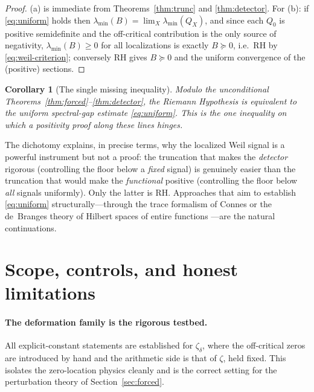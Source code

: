 \documentclass[11pt]{amsart}
\newtheorem{corollary}[theorem]{Corollary}
\theoremstyle{definition}
\theoremstyle{remark}
\newcommand{\lmin}{\lambda_{\min}}
\newcommand{\Qzero}{Q_{0}}
\begin{document}
\begin{proof}
(a) is immediate from Theorems~\ref{thm:trunc} and \ref{thm:detector}. For
(b): if \eqref{eq:uniform} holds then $\lmin(B)=\lim_X\lmin(Q_X)$, and since
each $\Qzero$ is positive semidefinite and the off-critical contribution is
the only source of negativity, $\lmin(B)\ge0$ for all localizations is
exactly $B\succeq0$, i.e.\ RH by \eqref{eq:weil-criterion}; conversely RH
gives $B\succeq0$ and the uniform convergence of the (positive) sections.
\end{proof}

\begin{corollary}[The single missing inequality]\label{cor:LB}
Modulo the unconditional Theorems~\ref{thm:forced}--\ref{thm:detector}, the
Riemann Hypothesis is equivalent to the uniform spectral-gap estimate
\eqref{eq:uniform}. This is the one inequality on which a positivity proof
along these lines hinges.
\end{corollary}

The dichotomy explains, in precise terms, why the localized Weil signal is a
powerful instrument but not a proof: the truncation that makes the
\emph{detector} rigorous (controlling the floor below a \emph{fixed} signal)
is genuinely easier than the truncation that would make the \emph{functional}
positive (controlling the floor below \emph{all} signals uniformly). Only the
latter is RH. Approaches that aim to establish \eqref{eq:uniform}
structurally---through the trace formalism of Connes \cite{Connes1999} or the
de~Branges theory of Hilbert spaces of entire functions \cite{deBranges}---are
the natural continuations.

\section{Scope, controls, and honest limitations}\label{sec:scope}

\paragraph{The deformation family is the rigorous testbed.}
All explicit-constant statements are established for $\zeta_\delta$, where the
off-critical zeros are introduced by hand and the arithmetic side is that of
$\zeta$, held fixed. This isolates the zero-location physics cleanly and is
the correct setting for the perturbation theory of Section~\ref{sec:forced}.
\end{document}
